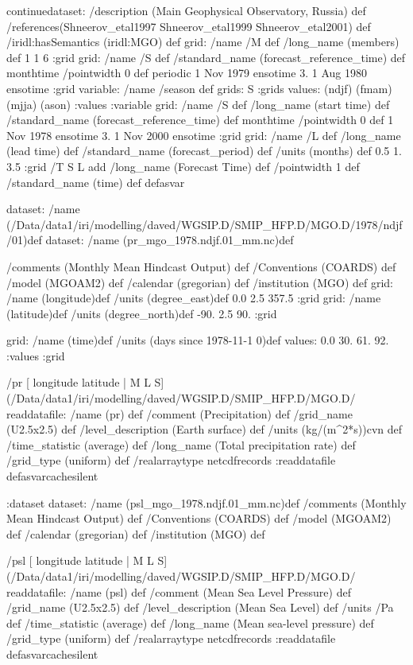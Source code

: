 \begin{ingrid}
continuedataset:
/description (Main Geophysical Observatory, Russia) def
/references(Shneerov_etal1997 Shneerov_etal1999 Shneerov_etal2001) def
/iridl:hasSemantics (iridl:MGO) def
grid:
/name /M def
/long_name (members) def
1 1 6
:grid
grid:
/name /S def
/standard_name (forecast_reference_time) def
monthtime
/pointwidth 0 def
periodic
1 Nov 1979 ensotime
3.
1 Aug 1980 ensotime
:grid
variable:
/name /season def
grids: S :grids
values:
(ndjf)
(fmam)
(mjja)
(ason)
:values
:variable
grid:
/name /S def
/long_name (start time) def
/standard_name (forecast_reference_time) def
monthtime
/pointwidth 0 def
1 Nov 1978 ensotime
3.
1 Nov 2000 ensotime
:grid
grid:
/name /L def
/long_name (lead time) def
/standard_name (forecast_period) def
/units (months) def
0.5 1. 3.5
:grid
/T { S L add /long_name (Forecast Time) def /pointwidth 1 def
/standard_name (time) def
} defasvar
\end{ingrid}
dataset:
/name (/Data/data1/iri/modelling/daved/WGSIP.D/SMIP_HFP.D/MGO.D/1978/ndjf/01)def
dataset:
/name (pr_mgo_1978.ndjf.01_mm.nc)def
\begin{ingrid}
 /comments (Monthly Mean Hindcast Output) def
 /Conventions (COARDS) def
 /model (MGOAM2) def
 /calendar (gregorian) def
 /institution (MGO) def
grid:
/name (longitude)def
/units (degree_east)def
 0.0 2.5 357.5
:grid
grid:
/name (latitude)def
/units (degree_north)def
 -90. 2.5 90.
:grid
\end{ingrid}
grid:
/name (time)def
/units (days since 1978-11-1 0)def
values: 0.0 30. 61. 92. :values
:grid
\begin{ingrid}
 /pr{
[ longitude latitude | M L S]
(/Data/data1/iri/modelling/daved/WGSIP.D/SMIP_HFP.D/MGO.D/%
readdatafile:
/name (pr) def
 /comment (Precipitation) def
 /grid_name (U2.5x2.5) def
 /level_description (Earth surface) def
 /units (kg/(m^2*s))cvn def
 /time_statistic (average) def
 /long_name (Total precipitation rate) def
 /grid_type (uniform) def
 /realarraytype netcdfrecords :readdatafile
}defasvarcachesilent
\end{ingrid}
:dataset
dataset:
/name (psl_mgo_1978.ndjf.01_mm.nc)def
 /comments (Monthly Mean Hindcast Output) def
 /Conventions (COARDS) def
 /model (MGOAM2) def
 /calendar (gregorian) def
 /institution (MGO) def
\begin{ingrid}
 /psl{
[ longitude latitude | M L S]
(/Data/data1/iri/modelling/daved/WGSIP.D/SMIP_HFP.D/MGO.D/%
readdatafile:
/name (psl) def
 /comment (Mean Sea Level Pressure) def
 /grid_name (U2.5x2.5) def
 /level_description (Mean Sea Level) def
 /units /Pa def
 /time_statistic (average) def
 /long_name (Mean sea-level pressure) def
 /grid_type (uniform) def
 /realarraytype netcdfrecords :readdatafile
}defasvarcachesilent
\end{ingrid}
